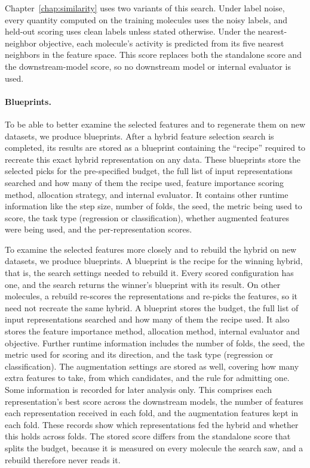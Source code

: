 Chapter~\ref{chap:similarity} uses two variants of this search. Under label noise, every quantity computed on the training molecules uses the noisy labels, and held-out scoring uses clean labels unless stated otherwise. Under the nearest-neighbor objective, each molecule's activity is predicted from its five nearest neighbors in the feature space. This score replaces both the standalone score and the downstream-model score, so no downstream model or internal evaluator is used.



\paragraph{Blueprints.}

To be able to better examine the selected features and to regenerate them on new datasets, we produce blueprints. After a hybrid feature selection search is completed, its results are stored as a blueprint containing the ``recipe'' required to recreate this exact hybrid representation on any data. These blueprints store the selected picks for the pre-specified budget, the full list of input representations searched and how many of them the recipe used, feature importance scoring method, allocation strategy, and internal evaluator. It contains other runtime information like the step size, number of folds, the seed, the metric being used to score, the task type (regression or classification), whether augmented features were being used, and the per-representation scores.

To examine the selected features more closely and to rebuild the hybrid on new datasets, we produce blueprints. A blueprint is the recipe for the winning hybrid, that is, the search settings needed to rebuild it. Every scored configuration has one, and the search returns the winner's blueprint with its result. On other molecules, a rebuild re-scores the representations and re-picks the features, so it need not recreate the same hybrid. A blueprint stores the budget, the full list of input representations searched and how many of them the recipe used. It also stores the feature importance method, allocation method, internal evaluator and objective. Further runtime information includes the number of folds, the seed, the metric used for scoring and its direction, and the task type (regression or classification). The augmentation settings are stored as well, covering how many extra features to take, from which candidates, and the rule for admitting one. Some information is recorded for later analysis only. This comprises each representation's best score across the downstream models, the number of features each representation received in each fold, and the augmentation features kept in each fold. These records show which representations fed the hybrid and whether this holds across folds. The stored score differs from the standalone score that splits the budget, because it is measured on every molecule the search saw, and a rebuild therefore never reads it.

